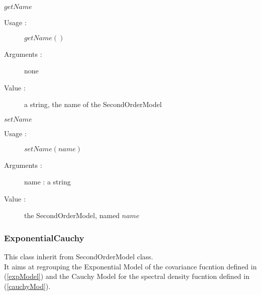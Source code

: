 \begin{description}
  \item $getName$
    \begin{description}
    \item[Usage :] $getName()$
    \item[Arguments :] none
    \item[Value :] a string, the name of the SecondOrderModel
    \end{description}
    \bigskip

  \item $setName$
    \begin{description}
    \item[Usage :] $setName(name)$
    \item[Arguments :] name : a string
    \item[Value :] the SecondOrderModel, named $name$
    \end{description}
    \bigskip


\end{description}


\newpage \subsubsection{ExponentialCauchy}

This class inherit from SecondOrderModel class.\\
It aims at regrouping the Exponential Model of the covariance fucntion defined in (\ref{expModel}) and the Cauchy Model for the spectral density fucntion defined in (\ref{cauchyMod}). 



